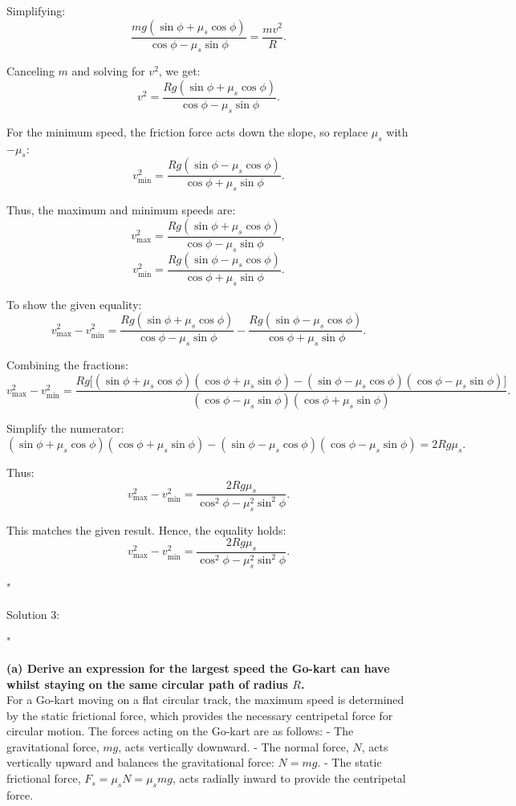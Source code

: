 Simplifying:
\[
\frac{mg (\sin\phi + \mu_s \cos\phi)}{\cos\phi - \mu_s \sin\phi} = \frac{mv^2}{R}.
\]

Canceling $m$ and solving for $v^2$, we get:
\[
v^2 = \frac{Rg (\sin\phi + \mu_s \cos\phi)}{\cos\phi - \mu_s \sin\phi}.
\]

For the minimum speed, the friction force acts down the slope, so replace $\mu_s$ with $-\mu_s$:
\[
v_{\text{min}}^2 = \frac{Rg (\sin\phi - \mu_s \cos\phi)}{\cos\phi + \mu_s \sin\phi}.
\]

Thus, the maximum and minimum speeds are:
\[
v_{\text{max}}^2 = \frac{Rg (\sin\phi + \mu_s \cos\phi)}{\cos\phi - \mu_s \sin\phi},
\]
\[
v_{\text{min}}^2 = \frac{Rg (\sin\phi - \mu_s \cos\phi)}{\cos\phi + \mu_s \sin\phi}.
\]

To show the given equality:
\[
v_{\text{max}}^2 - v_{\text{min}}^2 = \frac{Rg (\sin\phi + \mu_s \cos\phi)}{\cos\phi - \mu_s \sin\phi} - \frac{Rg (\sin\phi - \mu_s \cos\phi)}{\cos\phi + \mu_s \sin\phi}.
\]

Combining the fractions:
\[
v_{\text{max}}^2 - v_{\text{min}}^2 = \frac{Rg \big[(\sin\phi + \mu_s \cos\phi)(\cos\phi + \mu_s \sin\phi) - (\sin\phi - \mu_s \cos\phi)(\cos\phi - \mu_s \sin\phi)\big]}{(\cos\phi - \mu_s \sin\phi)(\cos\phi + \mu_s \sin\phi)}.
\]

Simplify the numerator:
\[
(\sin\phi + \mu_s \cos\phi)(\cos\phi + \mu_s \sin\phi) - (\sin\phi - \mu_s \cos\phi)(\cos\phi - \mu_s \sin\phi) = 2Rg\mu_s.
\]

Thus:
\[
v_{\text{max}}^2 - v_{\text{min}}^2 = \frac{2Rg\mu_s}{\cos^2\phi - \mu_s^2 \sin^2\phi}.
\]

This matches the given result. Hence, the equality holds:
\[
\boxed{v_{\text{max}}^2 - v_{\text{min}}^2 = \frac{2Rg\mu_s}{\cos^2\phi - \mu_s^2 \sin^2\phi}}.
\]

"

Solution 3:

"

\textbf{(a) Derive an expression for the largest speed the Go-kart can have whilst staying on the same circular path of radius $R$.} \\

For a Go-kart moving on a flat circular track, the maximum speed is determined by the static frictional force, which provides the necessary centripetal force for circular motion. The forces acting on the Go-kart are as follows:
- The gravitational force, $mg$, acts vertically downward.
- The normal force, $N$, acts vertically upward and balances the gravitational force: $N = mg$.
- The static frictional force, $F_s = \mu_s N = \mu_s mg$, acts radially inward to provide the centripetal force.

